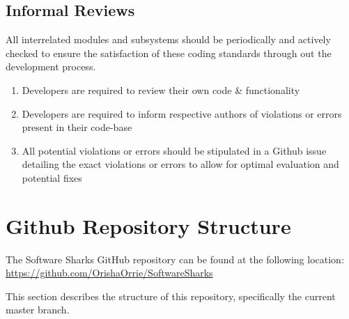 \documentclass[a4paper, 11pt]{article}
\begin{document}
\subsection{Informal Reviews}
All interrelated modules and subsystems should be periodically and actively checked to ensure the satisfaction of these coding standards through out the development process.
\begin{enumerate}
    \item Developers are required to review their own code \& functionality
    \item Developers are required to inform respective authors of violations or errors present in their code-base
    \item All potential violations or errors should be stipulated in a Github issue detailing the exact violations or errors to allow for optimal evaluation and potential fixes
\end{enumerate}

\pagebreak
\section{Github Repository Structure}
The Software Sharks GitHub repository can be found at the following location:
\url{https://github.com/OrishaOrrie/SoftwareSharks}

This section describes the structure of this repository, specifically the current master branch.
\end{document}
